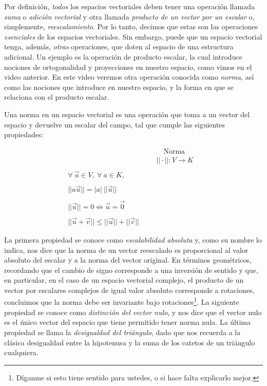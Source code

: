 \documentclass[12pt,dvipsnames]{article}
\numberwithin{equation}{section}
\begin{document}
Por definición, \emph{todos} los espacios vectoriales deben tener una operación llamada \emph{suma} o \emph{adición vectorial} y otra llamada \emph{producto de un vector por un escalar} o, simplemente, \emph{reescalamiento}. Por lo tanto, decimos que estas son las operaciones \emph{esenciales} de los espacios vectoriales. Sin embargo, puede que un espacio vectorial tenga, además, \emph{otras} operaciones, que doten al espacio de una estructura adicional. Un ejemplo es la operación de producto escalar, la cual introduce nociones de ortogonalidad y proyecciones en nuestro espacio, como vimos en el video anterior. En este video veremos otra operación conocida como \emph{norma}, así como las nociones que introduce en nuestro espacio, y la forma en que se relaciona con el producto escalar.

Una norma en un espacio vectorial es una operación que toma a un vector del espacio y devuelve un escalar del campo, tal que cumple las siguientes propiedades:

\begin{align*}
     & & &\quad \text{Norma}& \\
     & & &||\cdot||:V\to K& \\
     \\
     \forall \ \vec{u}\in V, \ \forall \ a\in K, \\
     \\
     ||a\vec{u}|| = |a| \ ||\vec{u}||\\
     \\
     ||\vec{u}|| = 0 \iff \vec{u} = \vec{0}\\
     \\
     ||\vec{u}+\vec{v}|| \le ||\vec{u}|| + ||\vec{v}||
\end{align*}

La primera propiedad se conoce como \emph{escalabilidad absoluta} y, como su nombre lo indica, nos dice que la norma de un vector reescalado es proporcional al valor absoluto del escalar y a la norma del vector original. En términos geométricos, recordando que el cambio de signo corresponde a una inversión de sentido y que, en particular, en el caso de un espacio vectorial complejo, el producto de un vector por escalares complejos de igual valor absoluto corresponde a rotaciones, concluimos que la norma debe ser invariante bajo rotaciones\footnote{Díganme si esto tiene sentido para ustedes, o si hace falta explicarlo mejor.}. La siguiente propiedad se conoce como \emph{distinción del vector nulo}, y nos dice que el vector nulo es el único vector del espacio que tiene permitido tener norma nula. La última propiedad se llama la \emph{desigualdad del triángulo}, dado que nos recuerda a la clásica desigualdad entre la hipotenusa y la suma de los catetos de un triángulo cualquiera. 
\end{document}
